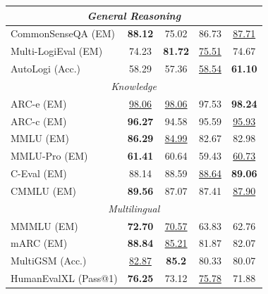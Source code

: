 \begin{table}[h]
{\begin{tabular}{lcccc}
\midrule
\multicolumn{5}{c}{\textit{General Reasoning}} \\
\midrule
CommonSenseQA (EM) & \textbf{88.12} & 75.02 & 86.73 & \underline{87.71} \\
Multi-LogiEval (EM) & 74.23 & \textbf{81.72} & \underline{75.51} & 74.67 \\
AutoLogi (Acc.) & 58.29 & 57.36 & \underline{58.54} & \textbf{61.10}\\
\midrule
\multicolumn{5}{c}{\textit{Knowledge}} \\
\midrule
ARC-e (EM) & \underline{98.06} & \underline{98.06} & 97.53 & \textbf{98.24}\\
ARC-c (EM) & \textbf{96.27} & 94.58 & 95.59 & \underline{95.93} \\
MMLU (EM) & \textbf{86.29} & \underline{84.99} & 82.67 & 82.98\\
MMLU-Pro (EM) & \textbf{61.41} & 60.64 & 59.43 & \underline{60.73}\\
C-Eval (EM) & 88.14 & 88.59 & \underline{88.64} & \textbf{89.06}\\
CMMLU (EM) & \textbf{89.56} & 87.07 & 87.41 & \underline{87.90} \\
\midrule
\multicolumn{5}{c}{\textit{Multilingual}} \\
\midrule
MMMLU (EM) & \textbf{72.70} & \underline{70.57} & 63.83 & 62.76\\
mARC (EM) & \textbf{88.84} & \underline{85.21} & 81.87 & 82.07 \\
MultiGSM (Acc.) & \underline{82.87} & \textbf{85.2} & 80.33 & 80.07 \\
HumanEvalXL (Pass@1) & \textbf{76.25} & 73.12 & \underline{75.78} & 71.88 \\
\bottomrule
\end{tabular}}
\end{table}


